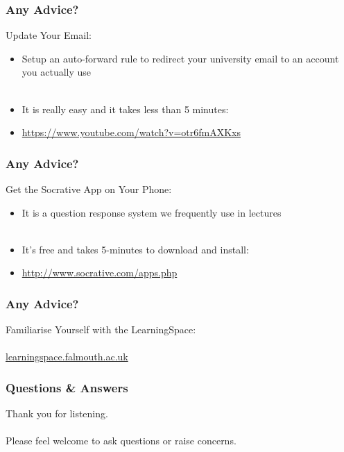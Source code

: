\begin{frame}
	\frametitle{Any Advice?}	
	
	Update Your Email:
	
	\begin{itemize}
		\item Setup an auto-forward rule to redirect your university email to an account you actually use
		\\~\\
		\item It is really easy and it takes less than 5 minutes:
		\item \url{https://www.youtube.com/watch?v=otr6fmAXKxs}
	\end{itemize}
\end{frame}

\begin{frame}
	\frametitle{Any Advice?}	
	
	Get the Socrative App on Your Phone:
	
	\begin{itemize}
		\item It is a question response system we frequently use in lectures
		\\~\\
		\item It's free and takes 5-minutes to download and install:
		\item \url{http://www.socrative.com/apps.php}
	\end{itemize}
\end{frame}

\begin{frame}
	\frametitle{Any Advice?}	
	
	Familiarise Yourself with the LearningSpace:
	\\~\\
	\url{learningspace.falmouth.ac.uk}
\end{frame}

\begin{frame}
	\frametitle{Questions \& Answers}	
	\begin{center}
		Thank you for listening. 
		\\~\\
		Please feel welcome to ask questions or raise concerns.
	\end{center}
\end{frame}


